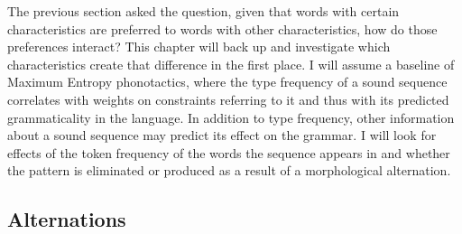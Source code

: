 The previous section asked the question, given that words with certain
characteristics are preferred to words with other characteristics, how do those
preferences interact? This chapter will back up and investigate which characteristics
create that difference in the first place. I will assume a baseline
of Maximum Entropy phonotactics, where the type frequency of a sound sequence
correlates with weights on constraints referring to it and thus with its
predicted grammaticality in the language.  In addition to type frequency, other
information about a sound sequence may predict its effect on the grammar.  I
will look for effects of the token frequency of the words the sequence appears
in and whether the pattern is eliminated or produced as a result of a
morphological alternation.

\subsection{Alternations}


